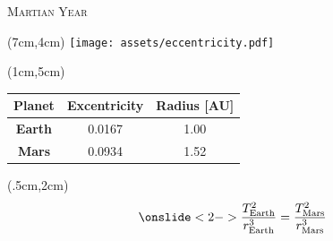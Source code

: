 \documentclass[9pt]{beamer}
\begin{document}
    \begin{frame}{\textsc{Martian Year}}
        \begin{textblock*}{5cm}(7cm,4cm)
            \centering
            \texttt{[image: assets/eccentricity.pdf]}
        \end{textblock*}
        
        \begin{textblock*}{5cm}(1cm,5cm)
            \centering
            \begin{tabular}{ccc}
                \hline
                \textbf{Planet} &{\textbf{Excentricity}} & {\textbf{Radius [AU]}}\\
                \hline
                \textbf{Earth}   &  0.0167 & {1.00} \\
                \textbf{Mars}    &  0.0934 & {1.52} \\ \hline
            \end{tabular}
        \end{textblock*}
        
        \begin{textblock*}{12cm}(.5cm,2cm)
        \begin{equation*}
            \onslide<2->{\frac{T_{\text{Earth}}^2}{r_{\text{Earth}}^3} = \frac{T_{\text{Mars}}^2}{r_{\text{Mars}}^3}}
        \end{equation*}
        \end{textblock*}
    \end{frame}
\end{document}
